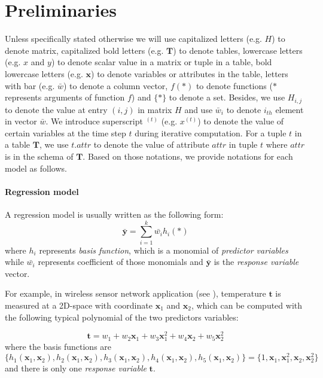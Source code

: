 \section{Preliminaries}\label{sec: pre}
Unless specifically stated otherwise we will use capitalized letters (e.g. $H$) to denote matrix, capitalized bold letters (e.g. $\textbf{T}$) to denote tables, lowercase letters (e.g. $x$ and $y$) to denote scalar value in a matrix or tuple in a table, bold lowercase letters (e.g. $\textbf{x}$) to denote variables or attributes in the table, letters with bar (e.g. $\bar{w}$) to denote a column vector, $f(*)$ to denote functions ($*$ represents arguments of function $f$) and $\{*\}$ to denote a set. Besides, we use $H_{i,j}$ to denote the value at entry $(i,j)$ in matrix $H$ and use $\bar{w}_i$ to denote $i_{th}$ element in vector $\bar{w}$. We introduce superscript $^{(t)}$ (e.g. $x^{(t)}$) to denote the value of certain variables at the time step $t$ during iterative computation. For a tuple $t$ in a table $\textbf{T}$, we use $t.attr$ to denote the value of attribute $attr$ in tuple $t$ where $attr$ is in the schema of $\textbf{T}$. Based on those notations, we provide notations for each model as follows.

\paragraph{Regression model}
A regression model is usually written as the following form:
\begin{equation}
\bar{\textbf{y}}=\sum_{i=1}^k\bar{w_i}h_i(*)
\end{equation}
where $h_i$ represents {\em basis function}, which is a monomial of {\em predictor variables} while $\bar{w_i}$ represents coefficient of those monomials and $\bar{\textbf{y}}$ is the {\em response variable} vector.

For example, in wireless sensor network application (see \cite{deshpande2006mauvedb}), temperature $\textbf{t}$ is measured at a 2D-space with coordinate $\textbf{x}_1$ and $\textbf{x}_2$, which can be computed with the following typical polynomial of the two predictors variables:

\begin{equation}
\textbf{t}=w_1 + w_2\textbf{x}_1+w_3\textbf{x}_1^2 + w_4\textbf{x}_2+w_5\textbf{x}_2^2
\end{equation}
where the basis functions are $\{h_1(\textbf{x}_1,\textbf{x}_2), h_2(\textbf{x}_1,\textbf{x}_2), h_3(\textbf{x}_1,\textbf{x}_2),h_4(\textbf{x}_1,\textbf{x}_2), h_5(\textbf{x}_1,\textbf{x}_2)\}=\{1, \textbf{x}_1, \textbf{x}_1^2, \textbf{x}_2, \textbf{x}_2^2\}$ and there is only one {\em response variable} $\textbf{t}$.

